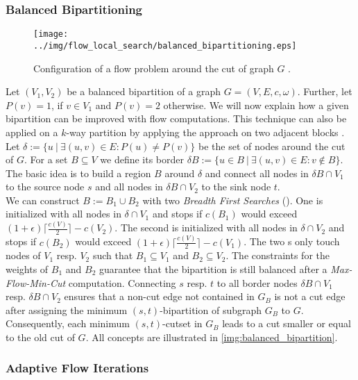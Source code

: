 \subsubsection{Balanced Bipartitioning}
\label{sec:balanced_bipartitioning}
\begin{figure}
\centering
\texttt{[image: ../img/flow\_local\_search/balanced\_bipartitioning.eps]}
\caption{Configuration of a flow problem around the cut of graph $G$ \cite{sanders2011engineering}.}
\label{img:balanced_bipartition}
\end{figure}
Let $(V_1,V_2)$ be a balanced bipartition of a graph $G = (V,E,c,\omega)$. 
Further, let $P(v) = 1$, if $v \in V_1$ and
$P(v) = 2$ otherwise. We will now explain how a given bipartition 
can be improved with flow computations. This technique can also be applied on a $k$-way 
partition by applying the approach on two adjacent blocks \cite{sanders2011engineering}. \\
Let $\delta := \{ u\ |\ \exists (u,v) \in E: P(u) \neq P(v) \}$ be the set of nodes
around the cut of $G$. For a set $B \subseteq V$ we define its border 
$\delta B := \{u \in B\ |\ \exists (u,v) \in E: v \notin B\}$.
The basic idea is to build a region $B$ around $\delta$
and connect all nodes in $\delta B \cap V_1$ to the source node $s$ and all nodes in 
$\delta B \cap V_2$ to the sink node $t$. \\
We can construct $B := B_1 \cup B_2$ with two \emph{Breadth First Searches} (\BFS). 
One is initialized with all nodes in $\delta \cap V_1$ and stops if $c(B_1)$ would 
exceed $(1+\epsilon) \lceil \frac{c(V)}{2} \rceil - c(V_2)$. The second is initialized with 
all nodes in $\delta \cap V_2$ and stops if $c(B_2)$ would exceed 
$(1+\epsilon) \lceil \frac{c(V)}{2} \rceil - c(V_1)$. The two \BFS s only touch nodes of $V_1$ resp. $V_2$
such that $B_1 \subseteq V_1$ and $B_2 \subseteq V_2$. The constraints for the weights of $B_1$
and $B_2$ guarantee that the bipartition is still balanced after a \emph{Max-Flow-Min-Cut}
computation. Connecting $s$ resp. $t$ to all border nodes $\delta B \cap V_1$ resp.
$\delta B \cap V_2$ ensures that a non-cut edge not contained in $G_B$ is not a cut edge after
assigning the minimum $(s,t)$-bipartition of subgraph $G_B$ to $G$. Consequently,
each minimum $(s,t)$-cutset in $G_B$ leads to a cut smaller or 
equal to the old cut of $G$. All concepts are illustrated in \autoref{img:balanced_bipartition}.


\subsubsection{Adaptive Flow Iterations}
\label{sec:adaptive_flow_iterations}

